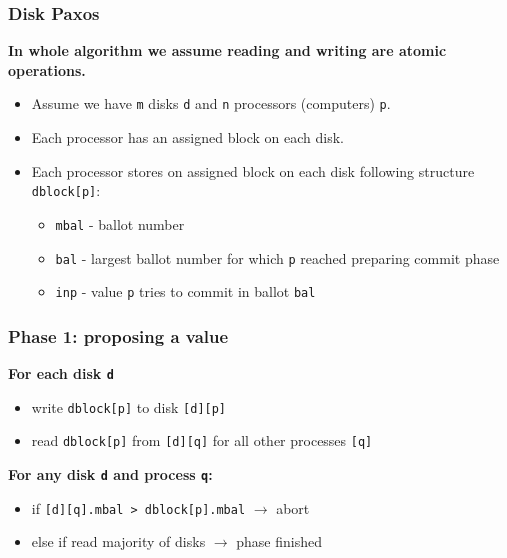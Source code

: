 \documentclass[10pt,utf8]{beamer}
\begin{document}
\begin{frame}
    \frametitle{Disk Paxos}
    \centering
    \textbf{In whole algorithm we assume reading and writing are atomic operations.}\\
    \vspace{1cm}
    
    \begin{itemize}
     \item Assume we have \texttt{m} disks \texttt{d} and \texttt{n} processors (computers) \texttt{p}.
     \item Each processor has an assigned block on each disk.
     \item Each processor stores on assigned block on each disk following structure \texttt{dblock[p]}:
     \begin{itemize}
        \item \texttt{mbal} - ballot number
        \item \texttt{bal} - largest ballot number for which \texttt{p} reached preparing commit phase
        \item \texttt{inp} - value \texttt{p} tries to commit in ballot \texttt{bal}
     \end{itemize}
    \end{itemize}
\end{frame}


\begin{frame}
    \frametitle{Phase 1: proposing a value}
    \centering
    \textbf{For each disk \texttt{d}}
    \vspace{0.5cm}
    \begin{itemize}
        \item write \texttt{dblock[p]} to disk \texttt{[d][p]}
        \item read \texttt{dblock[p]} from \texttt{[d][q]} for all other processes \texttt{[q]}
    \end{itemize}
    
    \vspace{1cm}
    
    \centering
    \textbf{For any disk \texttt{d} and process \texttt{q}:}
    \vspace{0.5cm}
    \begin{itemize}
        \item if \texttt{[d][q].mbal > dblock[p].mbal} $\rightarrow$ abort
        \item else if read majority of disks $\rightarrow$ phase finished
    \end{itemize}
\end{frame}
\end{document}
